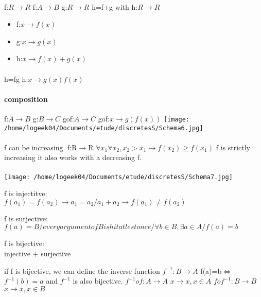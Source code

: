 \documentclass[a4paper,10pt]{article}
\begin{document}
{\paragraph{}
f:$R\longrightarrow R$ f:$A\longrightarrow B$
\newline
g:$R\longrightarrow R$
\newline
h=f+g with h:$R\longrightarrow R$
\newline
\begin{itemize}
 \item f:$x\longrightarrow f(x)$
 \item g:$x\longrightarrow g(x)$
  \item h:$x\longrightarrow f(x)+g(x)$
 \end{itemize}
\paragraph{}
h=fg
\newline
h:$x\longrightarrow g(x)f(x)$
\paragraph{composition}
 f:$A\longrightarrow B$
 \newline
 g:$B\longrightarrow C$
\newline
gof:$A\longrightarrow C$
\newline
gof:$x\longrightarrow g(f(x))$
\texttt{[image: /home/logeek04/Documents/etude/discretesS/Schema6.jpg]}
\paragraph{}
f can be increasing.
\newline
f:R$\longrightarrow$R
\newline
$\forall x_1\forall x_2,x_2>x_1\longrightarrow f(x_2)\geq f(x_1)$
\newline
f is strictly increasing
\newline
it also works with a decreasing f.
\paragraph{}
\texttt{[image: /home/logeek04/Documents/etude/discretesS/Schema7.jpg]}
\begin{description}
 \item f is injectitve:\\{$f(a_1)=f(a_2)\longrightarrow a_1=a_2/a_1+a_2\longrightarrow f(a_1)\neq f(a_2)$}
 \item f is surjective:\\{$f(a)=B/ every argument of B is hit at lest once/\forall b\in B,\exists a\in A/f(a)=b$}
 \item f is bijective:\\{injective + surjective}
\end{description}
if f is bijective, we can define the inverse function $f^{-1}:B\longrightarrow A$ f(a)=b$\Leftrightarrow$ $f^{-1}(b)=a$ and $f^{-1}$ is also bijective.
\newline
$f^{-1}of:A\longrightarrow A$ $x\longrightarrow x,x\in A$
$fof^{-1}:B\longrightarrow B$ $x\longrightarrow x,x\in B$
}
\end{document}

